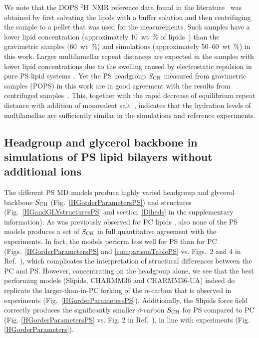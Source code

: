 \documentclass[journal=jpcbfk,manuscript=article]{achemso}
\begin{document}
We note that the DOPS $^2$H~NMR reference data found in the literature~\cite{browning80,roux90} was obtained by first solvating
the lipids with a buffer solution and then centrifuging the sample to a pellet that was used for the measurements. Such samples have a lower lipid concentration
(approximately 10~wt~\% of lipids~\cite{browning80,roux88,roux90}) than 
the gravimetric samples (60~wt~\%) and simulations (approximately 50--60~wt~\%) in this work.
Larger multilamellar repeat distances are expected in the samples with lower lipid
concentrations due to the swelling caused by electrostatic repulsion in pure PS lipid systems~\cite{millman82}.
Yet the PS headgroup  $S_{\rm CH}$  measured from gravimetric samples (POPS) in this work
are in good agreement with the results from centrifuged samples~\cite{browning80}. This, together with the rapid decrease of equilibrium repeat distance with addition of monovalent salt~\cite{millman82,rand89}, indicates that the hydration levels of multilamellae are sufficiently similar in the simulations and reference experiments.

\subsection{Headgroup and glycerol backbone in simulations of PS lipid bilayers without additional ions}

The different PS MD models produce highly varied headgroup and glycerol backbone  $S_{\rm CH}$ (Fig.~\ref{HGorderParametersPS})
and structures (Fig.~\ref{HGandGLYstructuresPS} and section~\ref{Diheds} in the supplementary information).
As was previously observed for PC lipids \cite{botan15}, also none of the PS models produces a set of  $S_{\rm CH}$ in full quantitative agreement with the experiments.
In fact, the models perform less well for PS than for PC
(Figs.~\ref{HGorderParametersPS} and \ref{comparisonTablePS} vs. Figs.~2 and 4 in Ref.~\cite{botan15}),
which complicates the interpretation of structural differences between the PC and PS. However, concentrating on the headgroup alone, we see that the best performing models (Slipids, CHARMM36 and CHARMM36-UA) indeed do replicate the larger-than-in-PC
forking of the $\alpha$-carbon that is observed in experiments (Fig.~\ref{HGorderParametersPS}).
Additionally, the Slipids force field correctly produces the significantly smaller $\beta$-carbon  $S_{\rm CH}$
for PS compared to PC (Fig. \ref{HGorderParametersPS} vs. Fig. 2 in Ref.~), in line with
experiments (Fig. \ref{HGorderParameters}).
\end{document}
